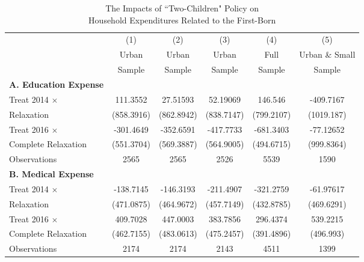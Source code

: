 \documentclass[12pt]{extarticle}
\begin{document}
\begin{table}
\centering
\caption{The Impacts of ``Two-Children" Policy on \\ Household Expenditures Related to the First-Born} \label{tab:childexp}
\begin{threeparttable}
\def\sym#1{\ifmmode^{#1}\else\(^{#1}\)\fi}
\begin{tabular}{l*{5}{c}}
\hline\hline
                    &\multicolumn{1}{c}{(1)}&\multicolumn{1}{c}{(2)}&\multicolumn{1}{c}{(3)}&\multicolumn{1}{c}{(4)}&\multicolumn{1}{c}{(5)}\\
	                &\multicolumn{1}{c}{Urban}&\multicolumn{1}{c}{Urban}&\multicolumn{1}{c}{Urban}&\multicolumn{1}{c}{Full}&\multicolumn{1}{c}{Urban \& Small}\\
		&\multicolumn{1}{c}{Sample}&\multicolumn{1}{c}{Sample}&\multicolumn{1}{c}{Sample}&\multicolumn{1}{c}{Sample}&\multicolumn{1}{c}{Sample}\\
\hline
\textbf{A. Education Expense} \\
Treat 2014 $\times$ &    111.3552   &    27.51593   &    52.19069   &     146.546   &   -409.7167   \\
\quad 2014 Relaxation     &  (858.3916)   &  (862.8942)   &  (838.7147)   &  (799.2107)   &  (1019.187)   \\
Treat 2016 $\times$ &   -301.4649   &   -352.6591   &   -417.7733   &   -681.3403   &   -77.12652   \\
\quad Complete Relaxation &  (551.3704)   &  (569.3887)   &  (564.9005)   &  (494.6715)   &  (999.8364)   \\
Observations        &        2565   &        2565   &        2526   &        5539   &        1590   \\
\textbf{B. Medical Expense}\\
Treat 2014 $\times$ &   -138.7145   &   -146.3193   &   -211.4907   &   -321.2759   &   -61.97617   \\
\quad 2014 Relaxation     &  (471.0875)   &  (464.9672)   &  (457.7149)   &  (432.8785)   &  (469.6291)   \\
Treat 2016 $\times$ &    409.7028   &    447.0003   &    383.7856   &    296.4374   &    539.2215   \\
\quad Complete Relaxation &  (462.7155)   &  (483.0613)   &  (475.2457)   &  (391.4896)   &   (496.993)   \\
Observations        &        2174   &        2174   &        2143   &        4511   &        1399   \\


\end{tabular}
\end{threeparttable}
\end{table}
\end{document}
